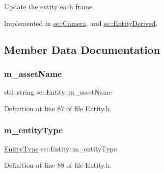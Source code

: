 Update the entity each frame. 

Implemented in \mbox{\hyperlink{classse_1_1_camera_abecf2d50dc793707a475b35bb487812c}{se\+::\+Camera}}, and \mbox{\hyperlink{classse_1_1_entity_derived_a4cd9c2bf0afaa2c72f4a6a52fbe947d7}{se\+::\+Entity\+Derived}}.



\subsection{Member Data Documentation}
\mbox{\label{classse_1_1_entity_aba1f7cc3700caee65b20c423185ab7ca}} 
\subsubsection{\texorpdfstring{m\+\_\+asset\+Name}{m\_assetName}}
{\footnotesize\ttfamily std\+::string se\+::\+Entity\+::m\+\_\+asset\+Name\hspace{0.3cm}{\ttfamily [protected]}}



Definition at line 87 of file Entity.\+h.

\mbox{\label{classse_1_1_entity_ac5d4a145ef27824a21ea1a4cb7a63e6c}} 
\subsubsection{\texorpdfstring{m\+\_\+entity\+Type}{m\_entityType}}
{\footnotesize\ttfamily \mbox{\hyperlink{namespacese_ae73a909a94998bc95235eb9b16e405f1}{Entity\+Type}} se\+::\+Entity\+::m\+\_\+entity\+Type\hspace{0.3cm}{\ttfamily [protected]}}



Definition at line 88 of file Entity.\+h.

\mbox{\label{classse_1_1_entity_ad59d1f9af185f480cd028db43d4ad0f2}} 
